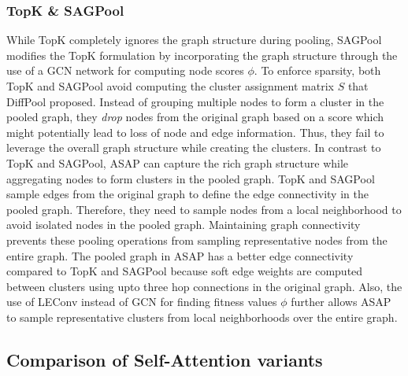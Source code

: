 \documentclass[letterpaper]{article} \usepackage{aaai20}  \usepackage{times}  \usepackage{helvet} \usepackage{courier}  \usepackage[hyphens]{url}  \usepackage{graphicx} \urlstyle{rm} \def\UrlFont{\rm}  \usepackage{graphicx}  \frenchspacing  \setlength{\pdfpagewidth}{8.5in}  \setlength{\pdfpageheight}{11in}
\begin{document}
\subsubsection{TopK \& SAGPool}
While TopK completely ignores the graph structure during pooling, SAGPool modifies the TopK formulation by incorporating the graph structure through the use of a GCN network for computing node scores $\phi$. To enforce sparsity, both TopK and SAGPool avoid computing the cluster assignment matrix $S$ that DiffPool proposed. Instead of grouping multiple nodes to form a cluster in the pooled graph, they \textit{drop} nodes from the original graph   based on a score \cite{topk2} which might potentially lead to loss of node and edge information. Thus, they fail to leverage the overall graph structure while creating the clusters. In contrast to TopK and SAGPool, ASAP can capture the rich graph structure while aggregating nodes to form clusters in the pooled graph. TopK and SAGPool sample edges from the original graph to define the edge connectivity in the pooled graph. Therefore, they need to sample nodes from a local neighborhood to avoid isolated nodes in the pooled graph. Maintaining graph connectivity prevents these pooling operations from sampling representative nodes from the entire graph. The pooled graph in ASAP has a better edge connectivity compared to TopK and SAGPool because soft edge weights are computed between clusters using upto three hop connections in the original graph. Also, the use of LEConv instead of GCN for finding fitness values $\phi$ further allows ASAP to sample representative clusters from local neighborhoods over the entire graph.

\subsection{Comparison of Self-Attention variants}
\label{ssec:m2t_compare}
\end{document}
